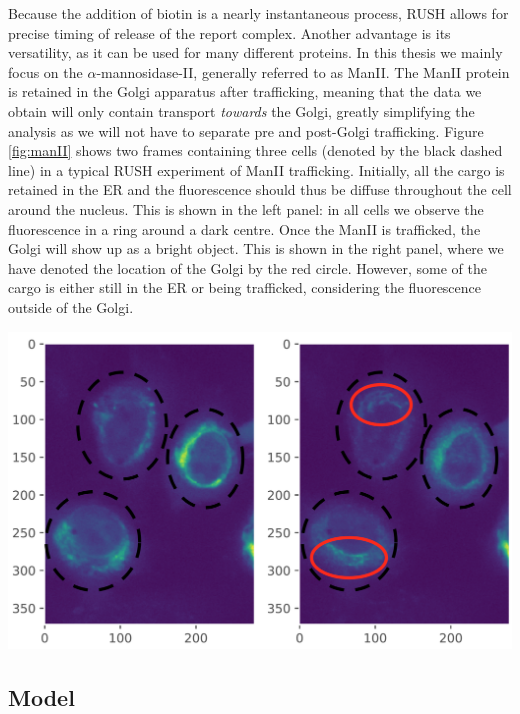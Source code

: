 \documentclass{Dissertate}
\let\origfigure\figure
\let\endorigfigure\endfigure
\renewenvironment{figure}[1][2] {
    \expandafter\origfigure\expandafter[H]
} {
    \endorigfigure
}
\begin{document}
Because the addition of biotin is a nearly instantaneous process, RUSH allows for precise timing of release of the report complex. Another advantage is its versatility, as it can be used for many different proteins. In this
thesis we mainly focus on the \(\alpha\)-mannosidase-II, generally
referred to as ManII. The ManII protein is retained in the Golgi apparatus
after trafficking, meaning that the data we
obtain will only contain transport \emph{towards} the Golgi, greatly
simplifying the analysis as we will not have to separate pre and post-Golgi trafficking.
Figure \ref{fig:manII} shows two frames containing three cells (denoted by the black dashed line) in a typical RUSH
experiment of ManII trafficking.  Initially, all the cargo is retained in the ER and the fluorescence should thus be diffuse throughout the cell around the nucleus. This is shown in the left panel: in all cells we observe the fluorescence in a ring around a dark centre. Once the ManII is trafficked, the Golgi will show up as a bright object. This is shown in the right panel, where we have denoted the location of the Golgi by the red circle. However, some of the cargo is either still in the ER or being trafficked, considering the fluorescence outside of the Golgi.

\begin{figure}
\hypertarget{fig:manII}{%
\centering
\includegraphics{source/figures/png/frames.png}
\caption{Two frames of the ManII transport images using the RUSH
technique.}\label{fig:manII}
}
\end{figure}

\hypertarget{model}{%
\subsection{Model}\label{model}}
\end{document}
